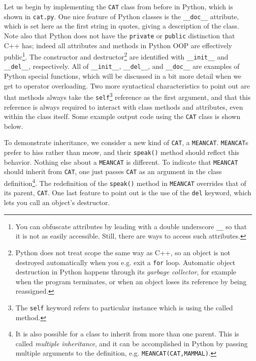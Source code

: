 Let us begin by implementing the \texttt{CAT} class from before in Python,
which is shown in \texttt{cat.py}. One nice feature of Python classes
is the \texttt{\_\_doc\_\_} attribute, which is set here as the first string
in quotes, giving a description of the class. Note also that Python
does not have the \texttt{private} or \texttt{public} distinction that
C++ has; indeed all attributes and methods in Python OOP are effectively 
public\footnote{You can obfuscate attributes by leading with a double 
underscore \texttt{\_\_} so that it is not as easily accessible. Still, there 
are ways to access such attributes.}.
The constructor and destructor\footnote{Python does not treat scope the same
way as C++, so an object is not destroyed automatically when you e.g.
exit a \texttt{for} loop. Automatic object destruction in Python 
happens through 
its {\it garbage collector}, for example when the program terminates,
or when an object loses its reference by being reassigned.} are identified with
\texttt{\_\_init\_\_} and \texttt{\_\_del\_\_}, respectively. All of
\texttt{\_\_init\_\_}, \texttt{\_\_del\_\_}, and \texttt{\_\_doc\_\_} 
are examples of
Python special functions, which will be discussed in a bit more detail
when we get to operator overloading. 
Two more syntactical characteristics 
to point out are that methods always take the \texttt{self}\footnote{The
\texttt{self} keyword refers to particular instance which is using
the called method.} reference as 
the first argument, and that this reference is always required to
interact with class methods and attributes, even within the class itself.
Some example output code using the \texttt{CAT} class is shown below.\\

\begin{code*}
\end{code*}
\begin{code*}
\end{code*}

To demonstrate inheritance, we consider a new kind of \texttt{CAT}, a
\texttt{MEANCAT}. \texttt{MEANCAT}s prefer to hiss rather than meow, and
their \texttt{speak()} method should reflect this behavior. Nothing else
about a \texttt{MEANCAT} is different. To indicate that \texttt{MEANCAT}
should inherit from \texttt{CAT}, one just passes \texttt{CAT} as an argument
in the class definition\footnote{It is also possible for a class to inherit
from more than one parent. This is called {\it multiple inheritance},
 and it can be accomplished in Python by passing
multiple arguments to the definition, e.g. \texttt{MEANCAT(CAT,MAMMAL)}.}. 
The redefinition of the \texttt{speak()} method
in \texttt{MEANCAT} overrides that of its parent, \texttt{CAT}. One last
feature to point out is the use of the \texttt{del} keyword, which lets you
call an object's destructor.\\

